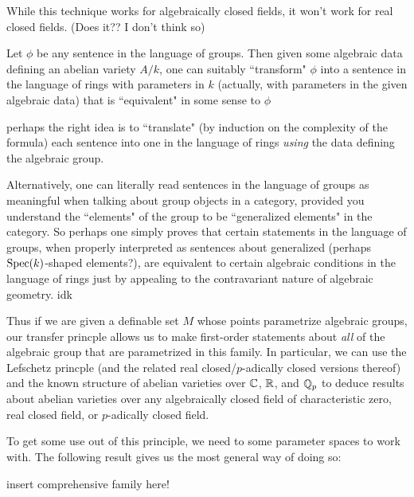 While this technique works for algebraically closed fields, it won't work for real closed fields. (Does it?? I don't think so) 

\begin{theorem}
\label{transfer-principle}
Let $\phi$ be any sentence in the language of groups. Then given some algebraic data defining an abelian variety $A/k$, one can suitably ``transform" $\phi$ into a sentence in the language of rings with parameters in $k$ (actually, with parameters in the given algebraic data) that is ``equivalent" in some sense to $\phi$
\end{theorem}

perhaps the right idea is to ``translate" (by induction on the complexity of the formula) each sentence into one in the language of rings \emph{using} the data defining the algebraic group. 

Alternatively, one can literally read sentences in the language of groups as meaningful when talking about group objects in a category, provided you understand the ``elements" of the group to be ``generalized elements" in the category. So perhaps one simply proves that certain statements in the language of groups, when properly interpreted as sentences about generalized (perhaps $\operatorname{Spec}(k)$-shaped elements?), are equivalent to certain algebraic conditions in the language of rings just by appealing to the contravariant nature of algebraic geometry. idk

Thus if we are given a definable set $M$ whose points parametrize algebraic groups, our transfer princple allows us to make first-order statements about \emph{all} of the algebraic group that are parametrized in this family. In particular, we can use the Lefschetz princple (and the related real closed/$p$-adically closed versions thereof) and the known structure of abelian varieties over $\mathbb{C}$, $\mathbb{R}$, and $\mathbb{Q}_p$ to deduce results about abelian varieties over any algebraically closed field of characteristic zero, real closed field, or $p$-adically closed field. 

To get some use out of this principle, we need to some parameter spaces to work with. The following result gives us the most general way of doing so:

insert comprehensive family here!